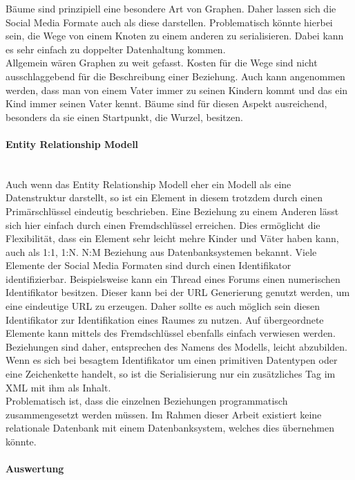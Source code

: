 \documentclass[a4paper]{article}
\begin{document}
	Bäume sind prinzipiell eine besondere Art von Graphen. Daher lassen sich
	die Social Media Formate auch als diese darstellen. Problematisch
	könnte hierbei sein, die Wege von einem Knoten zu einem anderen zu
	serialisieren. Dabei kann es sehr einfach zu doppelter Datenhaltung kommen. \\
	
	Allgemein wären Graphen zu weit gefasst. Kosten für die Wege sind nicht
	ausschlaggebend für die Beschreibung einer Beziehung. Auch kann angenommen
	werden, dass man von einem Vater immer zu seinen Kindern kommt und das ein Kind
	immer seinen Vater kennt. Bäume sind für diesen Aspekt ausreichend, besonders da
	sie einen Startpunkt, die Wurzel, besitzen.
	
	\paragraph{Entity Relationship Modell}\mbox{} \\
	
	Auch wenn das Entity Relationship Modell eher ein Modell als
	eine Datenstruktur darstellt, so ist ein Element in diesem trotzdem
	durch einen Primärschlüssel eindeutig beschrieben.
	Eine Beziehung zu einem Anderen lässt sich hier einfach durch einen
	Fremdschlüssel erreichen. Dies ermöglicht die Flexibilität, dass ein Element
	sehr leicht mehre Kinder und Väter haben kann, auch als 1:1, 1:N. N:M Beziehung
	aus Datenbanksystemen bekannt. Viele Elemente der Social Media Formaten sind
	durch einen Identifikator identifizierbar. Beispielsweise kann ein Thread eines
	Forums einen numerischen Identifikator besitzen. Dieser kann bei der
	URL Generierung	genutzt werden, um eine eindeutige URL zu erzeugen. Daher sollte
	es auch möglich sein diesen Identifikator zur Identifikation eines Raumes zu
	nutzen. Auf übergeordnete Elemente kann mittels des Fremdschlüssel ebenfalls
	einfach verwiesen werden. Beziehungen sind daher, entsprechen des Namens des
	Modells, leicht abzubilden.	Wenn es sich bei besagtem Identifikator um einen
	primitiven Datentypen oder eine Zeichenkette handelt, so ist die
	Serialisierung nur ein zusätzliches Tag im XML mit ihm als Inhalt. \\
	
	Problematisch ist, dass die einzelnen Beziehungen programmatisch 
	zusammengesetzt werden müssen. Im Rahmen dieser Arbeit existiert keine
	relationale	Datenbank mit einem Datenbanksystem, welches dies übernehmen
	könnte.
	
	\paragraph{Auswertung}\mbox{} \\
	
\end{document}
